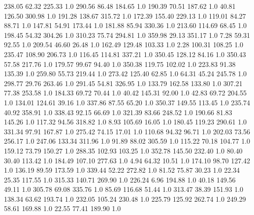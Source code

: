     238.05     62.32    225.33  1.0
    290.56     86.48    184.65  1.0
    190.39     70.51    187.62  1.0
     40.81    126.50    300.98  1.0
    191.28    138.67    315.72  1.0
    172.39    155.40    229.13  1.0
    119.01     84.27     88.71  1.0
    147.81     54.91    173.44  1.0
    181.88     85.94    330.36  1.0
    213.60    114.69     68.45  1.0
    198.45     54.32    304.26  1.0
    310.23     75.74    294.81  1.0
    359.98     29.13    351.17  1.0
      7.28     59.31     92.55  1.0
    209.54     46.60     26.48  1.0
    162.49    129.48    103.33  1.0
      2.28    100.31    108.25  1.0
    235.47    108.90    206.73  1.0
    116.45    114.81    337.21  1.0
    350.45    128.12     84.16  1.0
    350.43     57.58    217.76  1.0
    179.57     99.67     94.40  1.0
    350.38    119.75    102.02  1.0
    223.83     91.38    135.39  1.0
    259.80     55.73    219.44  1.0
    273.42    125.40     62.85  1.0
     64.31     45.24    245.78  1.0
    298.77     29.76    263.46  1.0
    291.45     54.81    326.95  1.0
    133.79    162.58    133.80  1.0
    307.21     77.38    253.58  1.0
    184.33     69.72     70.44  1.0
     40.42    145.31     92.00  1.0
     42.83     69.72    204.55  1.0
    134.01    124.61     39.16  1.0
    337.86     87.55     65.20  1.0
    350.37    149.55    113.45  1.0
    235.74     40.92    358.91  1.0
    338.43     92.15     66.69  1.0
    321.39     83.66    248.52  1.0
    190.66     81.83    145.26  1.0
    117.32     94.56    318.82  1.0
      8.93    105.69     16.05  1.0
    180.45    119.23    290.61  1.0
    331.34     97.91    167.87  1.0
    275.42     74.15     17.01  1.0
    110.68     94.32     96.71  1.0
    202.03     73.56    256.17  1.0
    247.06    133.34    311.96  1.0
     91.89     88.02    305.59  1.0
    115.22     70.18    104.77  1.0
    159.12     73.79    150.27  1.0
    288.35    102.93    103.25  1.0
    352.78    145.50    232.40  1.0
     80.40     30.40    113.42  1.0
    184.49    107.10    277.63  1.0
      4.94     64.32     10.51  1.0
    174.10     98.70    127.42  1.0
    136.19     89.59    173.59  1.0
    339.44     52.22    272.82  1.0
     81.52     75.87     30.23  1.0
     22.34     25.35    117.55  1.0
    315.33    140.71    269.90  1.0
    226.24      6.96    194.88  1.0
     40.18    149.56     49.11  1.0
    305.78     69.08    335.76  1.0
     85.69    116.68     51.44  1.0
    313.47     38.39    151.93  1.0
    138.34     63.62    193.74  1.0
    232.05    105.24    230.48  1.0
    225.79    125.92    262.74  1.0
    249.29     58.61    169.88  1.0
     22.55     77.41    189.90  1.0
